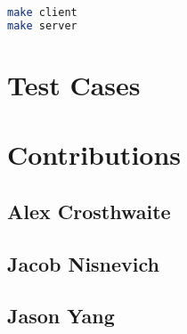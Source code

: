 \documentclass{article}
\begin{document}
\begin{lstlisting}[language=bash]
make client
make server
\end{lstlisting}

\section{Test Cases}

\subsection{}

\section{Contributions}

\subsection{Alex Crosthwaite}

\subsection{Jacob Nisnevich}

\subsection{Jason Yang}
\end{document}
